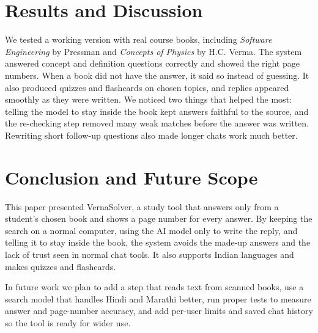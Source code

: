 \documentclass[journal]{IEEEtran}
\begin{document}
\section{Results and Discussion}
We tested a working version with real course books, including
\textit{Software Engineering} by Pressman and \textit{Concepts of
Physics} by H.C. Verma. The system answered concept and definition
questions correctly and showed the right page numbers. When a book did
not have the answer, it said so instead of guessing. It also produced
quizzes and flashcards on chosen topics, and replies appeared smoothly as
they were written. We noticed two things that helped the most: telling the
model to stay inside the book kept answers faithful to the source, and the
re-checking step removed many weak matches before the answer was written.
Rewriting short follow-up questions also made longer chats work much
better.

\section{Conclusion and Future Scope}
This paper presented VernaSolver, a study tool that answers only from a
student's chosen book and shows a page number for every answer. By keeping
the search on a normal computer, using the AI model only to write the
reply, and telling it to stay inside the book, the system avoids the
made-up answers and the lack of trust seen in normal chat tools. It also
supports Indian languages and makes quizzes and flashcards.

In future work we plan to add a step that reads text from scanned books,
use a search model that handles Hindi and Marathi better, run proper tests
to measure answer and page-number accuracy, and add per-user limits and
saved chat history so the tool is ready for wider use.
\end{document}
